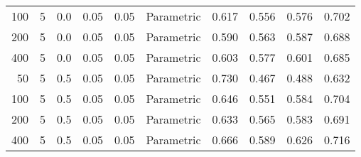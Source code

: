 \begin{table}
{{\begin{tabular}{rrrrrlllll}
\hspace{1em}100 & 5 & 0.0 & 0.05 & 0.05 & Parametric & 0.617 & 0.556 & 0.576 & 0.702\\
\hspace{1em}200 & 5 & 0.0 & 0.05 & 0.05 & Parametric & 0.590 & 0.563 & 0.587 & 0.688\\
\hspace{1em}400 & 5 & 0.0 & 0.05 & 0.05 & Parametric & 0.603 & 0.577 & 0.601 & 0.685\\
\hspace{1em}50 & 5 & 0.5 & 0.05 & 0.05 & Parametric & 0.730 & 0.467 & 0.488 & 0.632\\
\hspace{1em}100 & 5 & 0.5 & 0.05 & 0.05 & Parametric & 0.646 & 0.551 & 0.584 & 0.704\\
\hspace{1em}200 & 5 & 0.5 & 0.05 & 0.05 & Parametric & 0.633 & 0.565 & 0.583 & 0.691\\
\hspace{1em}400 & 5 & 0.5 & 0.05 & 0.05 & Parametric & 0.666 & 0.589 & 0.626 & 0.716\\
\bottomrule
\end{tabular}
}}
 \end{table}